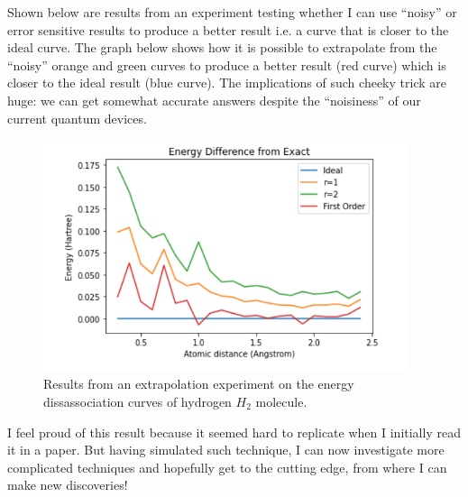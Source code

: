 \documentclass{article}
\begin{document}
\begin{itemize}
\begin{itemize}
  Shown below are results from an experiment testing whether I can use ``noisy''
  or error sensitive results to produce a better result i.e. a curve that
  is closer to the ideal curve. The graph below shows how it is possible to
  extrapolate from the ``noisy'' orange and green curves to produce a better
  result (red curve) which is closer to the ideal result (blue curve). The
  implications of such cheeky trick are huge: we can get somewhat accurate answers
  despite the ``noisiness'' of our current quantum devices.
  \begin{figure}[!htb]
	\centering
	\includegraphics[width=0.95\textwidth]{img/JournalTwo-f5cc5222.png}
	\caption{Results from an extrapolation experiment on the energy dissassociation
  curves of hydrogen \(H_2\) molecule.}
	\label{}
\end{figure}
\end{itemize}
I feel proud of this result because it seemed hard to replicate when I initially read it in a paper. But having simulated such technique, I
can now investigate more complicated techniques and hopefully get to
the cutting edge, from where I can make new discoveries!

\end{itemize}
\end{document}
